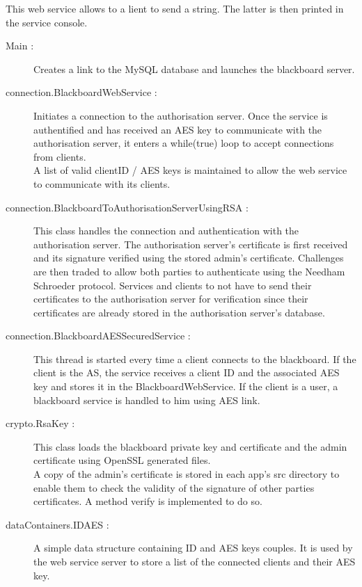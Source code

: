 This web service allows to a lient to send a string. The latter is then printed in the service console.

\begin{description}

\item[Main :]Creates a link to the MySQL database and launches the blackboard server.

\item[connection.BlackboardWebService :] Initiates a connection to the authorisation server. Once the service is authentified and has received an AES key to communicate with the authorisation server, it enters a while(true) loop to accept connections from clients.\\
A list of valid clientID / AES keys is maintained to allow the web service to communicate with its clients.

\item[connection.BlackboardToAuthorisationServerUsingRSA :] This class handles the connection and authentication with the authorisation server. The authorisation server's certificate is first received and its signature verified using the stored admin's certificate. Challenges are then traded to allow both parties to authenticate using the Needham Schroeder protocol. Services and clients to not have to send their certificates to the authorisation server for verification since their certificates are already stored in the authorisation server's database. 

\item[connection.BlackboardAESSecuredService :] This thread is started every time a client connects to the blackboard. If the client is the AS, the service receives a client ID and the associated AES key and stores it in the BlackboardWebService. If the client is a user, a blackboard service is handled to him using AES link.

\item[crypto.RsaKey :]This class loads the blackboard private key and certificate and the admin certificate using OpenSSL generated files. \\
A copy of the admin's certificate is stored in each app's src directory to enable them to check the validity of the signature of other parties certificates. A method verify is implemented to do so.

\item[dataContainers.IDAES :] A simple data structure containing ID and AES keys couples. It is used by the web service server to store a list of the connected clients and their AES key.

\end{description}

